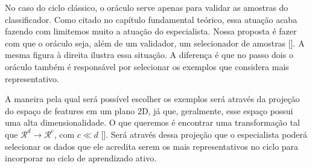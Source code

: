 No caso do ciclo clássico, o oráculo serve apenas para validar as amostras do classificador. Como citado no capítulo fundamental teórico, essa atuação acaba fazendo com limitemos muito a atuação do especialista. Nossa proposta é fazer com que o oráculo seja, além de um validador, um selecionador de amostras [\cite{kottke2018other}]. A mesma figura à direita ilustra essa situação. A diferença é que no passo dois o oráculo também é responsável por selecionar os exemplos que considera mais representativo. 

A maneira pela qual será possível escolher os exemplos será através da projeção do espaço de features em um plano 2D, já que, geralmente, esse espaço possui uma alta dimensionalidade. O que queremos é encontrar uma transformação tal que $\mathcal{R}^d \xrightarrow{} \mathcal{R}^c$, com $c \ll d$ [\cite{van2009dimensionality}]. Será através dessa projeção que o especialista poderá selecionar os dados que ele acredita serem os mais representativos no ciclo para incorporar no ciclo de aprendizado ativo. 




